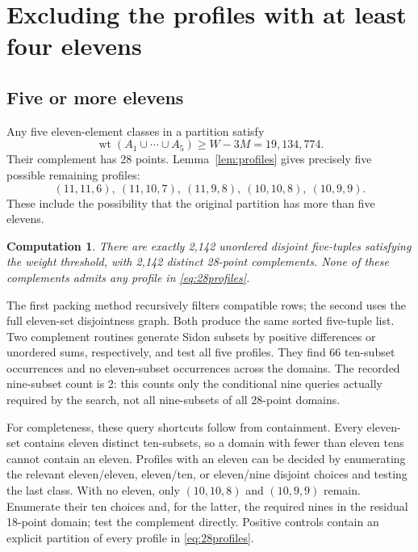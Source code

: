 \documentclass[11pt]{article}
\newtheorem{computation}[theorem]{Computation}
\newcommand{\wt}{\operatorname{wt}}
\begin{document}
\section{Excluding the profiles with at least four elevens}
\subsection{Five or more elevens}
Any five eleven-element classes in a partition satisfy
\[
                       \wt(A_1\cup\cdots\cup A_5)\geq W-3M
                                                   =19{,}134{,}774.
\]
Their complement has 28 points. Lemma~\ref{lem:profiles} gives precisely
five possible remaining profiles:
\begin{equation}\label{eq:28profiles}
          (11,11,6),\ (11,10,7),\ (11,9,8),\ (10,10,8),\ (10,9,9).
\end{equation}
These include the possibility that the original partition has more than
five elevens.

\begin{computation}\label{comp:five}
There are exactly 2,142 unordered disjoint five-tuples satisfying the
weight threshold, with 2,142 distinct 28-point complements. None of these
complements admits any profile in \eqref{eq:28profiles}.
\end{computation}

The first packing method recursively filters compatible rows; the second
uses the full eleven-set disjointness graph. Both produce the same sorted
five-tuple list. Two complement routines generate Sidon subsets by
positive differences or unordered sums, respectively, and test all five
profiles. They find 66 ten-subset occurrences and no eleven-subset
occurrences across the domains. The recorded nine-subset count is 2:
this counts only the conditional nine queries actually required by the
search, not all nine-subsets of all 28-point domains.

For completeness, these query shortcuts follow from containment. Every
eleven-set contains eleven distinct ten-subsets, so a domain with fewer
than eleven tens cannot contain an eleven. Profiles with an eleven can
be decided by enumerating the relevant eleven/eleven, eleven/ten, or
eleven/nine disjoint choices and testing the last class. With no eleven,
only $(10,10,8)$ and $(10,9,9)$ remain. Enumerate their ten choices and,
for the latter, the required nines in the residual 18-point domain;
test the complement directly. Positive controls contain an explicit
partition of every profile in \eqref{eq:28profiles}.
\end{document}
